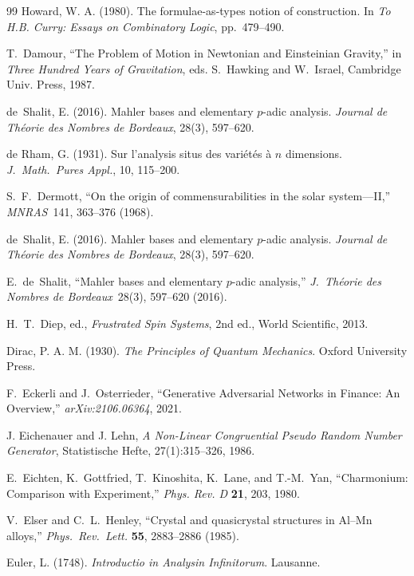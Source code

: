 \begin{thebibliography}{99}
 Howard, W. A. (1980). The formulae-as-types notion of construction. In \emph{To H.B. Curry: Essays on Combinatory Logic}, pp.~479--490.

T.~Damour, ``The Problem of Motion in Newtonian and Einsteinian Gravity,'' in \emph{Three Hundred Years of Gravitation}, eds. S.~Hawking and W.~Israel, Cambridge Univ. Press, 1987.

de~Shalit, E. (2016).
Mahler bases and elementary $p$-adic analysis.
\textit{Journal de Th\'eorie des Nombres de Bordeaux}, 28(3), 597--620.

 de Rham, G. (1931). Sur l'analysis situs des vari\'et\'es \`a $n$ dimensions. \emph{J.\ Math.\ Pures Appl.}, 10, 115--200.

 S.~F.~Dermott, ``On the origin of commensurabilities in the solar system---II,'' \emph{MNRAS}\ 141, 363--376 (1968).

de~Shalit, E. (2016).
Mahler bases and elementary $p$-adic analysis.
\emph{Journal de Th\'eorie des Nombres de Bordeaux}, 28(3), 597--620.

 E.~de~Shalit, ``Mahler bases and elementary $p$-adic analysis,'' \emph{J.\ Th\'eorie des Nombres de Bordeaux}\ 28(3), 597--620 (2016).

H.~T.~Diep, ed.,
\emph{Frustrated Spin Systems},
2nd ed., World Scientific, 2013.

 Dirac, P. A. M. (1930). \emph{The Principles of Quantum Mechanics}. Oxford University Press.

F.~Eckerli and J.~Osterrieder,
``Generative Adversarial Networks in Finance: An Overview,''
\emph{arXiv:2106.06364}, 2021.

J. Eichenauer and J. Lehn,
\textit{A Non-Linear Congruential Pseudo Random Number Generator},
Statistische Hefte, 27(1):315--326, 1986.

E.~Eichten, K.~Gottfried, T.~Kinoshita, K.~Lane, and T.-M.~Yan, ``Charmonium: Comparison with Experiment,'' \emph{Phys. Rev. D} \textbf{21}, 203, 1980.

V.~Elser and C.~L.~Henley,
``Crystal and quasicrystal structures in Al--Mn alloys,''
\emph{Phys.~Rev.~Lett.} \textbf{55}, 2883--2886 (1985).

 Euler, L. (1748). \emph{Introductio in Analysin Infinitorum}. Lausanne.


\end{thebibliography}
